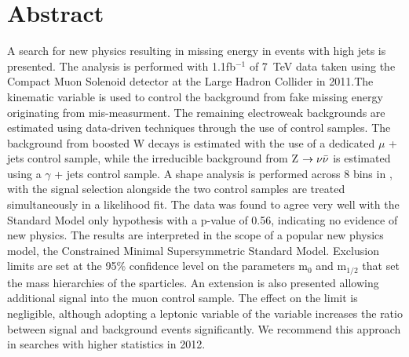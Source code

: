 \chapter*{Abstract}
\noindent 
\vspace{10mm}
\normalsize

A search for new physics resulting in missing energy in events with high \Pt jets is presented. The analysis is performed with 1.1fb$^{-1}$ of 7~TeV data taken using the Compact Muon Solenoid detector at the Large Hadron Collider in 2011.The kinematic variable \alt is used to control the background from fake missing energy originating from mis-measurment. The remaining electroweak backgrounds are estimated using data-driven techniques through the use of control samples. The background from boosted W decays is estimated with the use of a dedicated $\mu$ + jets control sample, while the irreducible background from Z $\rightarrow \nu \bar{\nu}$ is estimated using a $\gamma$ + jets control sample.  A shape analysis is performed across 8 bins in \HT, with the signal selection alongside the two control samples are treated simultaneously in a likelihood fit.  The data was found to agree very well with the Standard Model only hypothesis with a p-value of 0.56, indicating no evidence of new physics. The results are interpreted in the scope of a popular new physics model, the Constrained Minimal Supersymmetric Standard Model. Exclusion limits are set at the 95\% confidence level on the parameters m$_{0}$ and m$_{1/2}$ that set the mass hierarchies of the sparticles. An extension is also presented allowing additional signal into the muon control sample. The effect on the limit is negligible, although adopting a leptonic variable of the \alt variable increases the ratio between signal and background events significantly. We recommend this approach in searches with higher statistics in 2012. 



